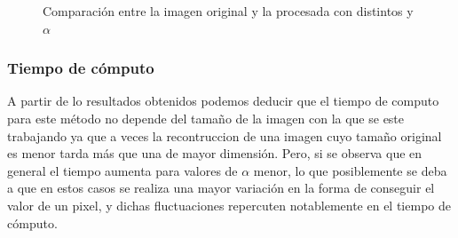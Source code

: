\documentclass[a4paper]{article}
\begin{document}
\begin{figure}[H]
\centering
{}
\caption{Comparación entre la imagen original y la procesada con distintos y $\alpha$}
\end{figure}

\subsubsection{Tiempo de cómputo}
A partir de lo resultados obtenidos podemos deducir que el tiempo de computo para este método no depende del tamaño de la imagen con la que se este trabajando ya que a veces la recontruccion de una imagen cuyo tamaño original es menor tarda más que una de mayor dimensi\'on. Pero, si se observa que en general el tiempo aumenta para valores de $\alpha$ menor, lo que posiblemente se deba a que en estos casos se realiza una mayor variación en la forma de conseguir el valor de un pixel, y dichas fluctuaciones repercuten notablemente en el tiempo de cómputo. 
\end{document}
